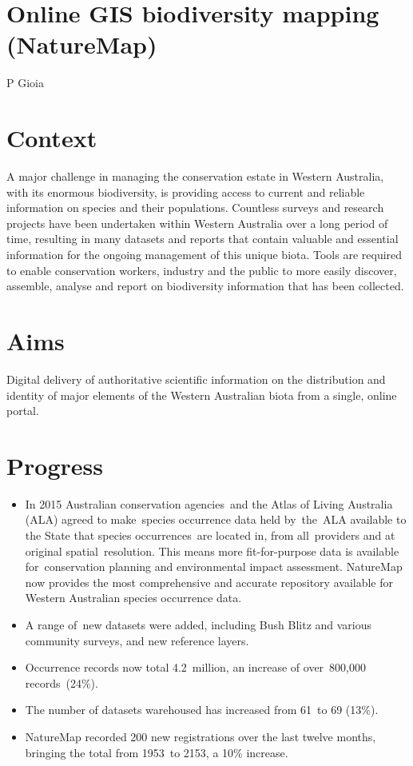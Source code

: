 \documentclass[version=last,
    paper=a4, %
    10pt, %
    usenames,
    dvipsnames,
    oneside, %
    headings=openany, %
    DIV=15 %
]{scrbook}
\begin{document}
\section*{Online GIS biodiversity mapping (NatureMap)
}

P Gioia


\section*{Context}
A major challenge in managing the conservation estate in Western
Australia, with its enormous biodiversity, is providing access to
current and reliable information on species and their populations.
Countless surveys and research projects have been undertaken within
Western Australia over a long period of time, resulting in many datasets
and reports that contain valuable and essential information for the
ongoing management of this unique biota. Tools are required to enable
conservation workers, industry and the public to more easily discover,
assemble, analyse and report on biodiversity information that has been
collected.



\section*{Aims}
Digital delivery of authoritative scientific information on the
distribution and identity of major elements of the Western Australian
biota from a single, online portal.



\section*{Progress}
\begin{itemize}
\itemsep1pt\parskip0pt
\item
  In 2015 Australian conservation agencies~and the Atlas of Living
  Australia (ALA) agreed to make~species occurrence data held by~the~ALA
  available to the State that species occurrences~are located in, from
  all~providers and at original spatial~resolution. This means more
  fit-for-purpose data is available for~conservation planning and
  environmental impact assessment. NatureMap now provides the most
  comprehensive and accurate repository available for Western Australian
  species occurrence data.
\item
  A range of~new datasets were added, including Bush Blitz and various
  community surveys, and new reference layers.
\item
  Occurrence records now total 4.2~million, an increase of over~800,000
  records~(24\%).
\item
  The number of datasets warehoused has increased from 61~to 69 (13\%).
\item
  NatureMap recorded 200 new registrations over the last twelve months,
  bringing the total from 1953~to 2153, a 10\% increase.
\end{itemize}
\end{document}
